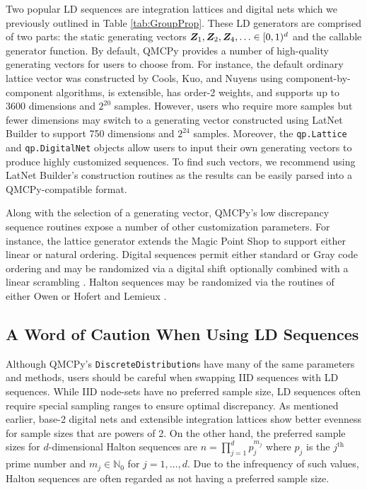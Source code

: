 \documentclass[graybox,footinfo]{svmult}
\begin{document}
Two popular LD sequences are integration lattices and digital nets which we previously outlined in Table \ref{tab:GroupProp}. These LD generators are comprised of two parts: the static generating vectors ${\boldsymbol{Z}}_1,{\boldsymbol{Z}}_2,{\boldsymbol{Z}}_4, \ldots \in [0,1)^d$ and the callable generator function. By default, QMCPy provides a number of high-quality generating vectors for users to choose from. For instance, the default ordinary lattice vector was constructed by Cools, Kuo, and Nuyens \cite{doi:10.1137/06065074X} using component-by-component algorithms, is extensible, has order-2 weights, and supports up to 3600 dimensions and $2^{20}$ samples. 
However, users who require more samples but fewer dimensions may switch to a generating vector constructed using LatNet Builder \cite{LEcEtal22a,LatNet} to support 750 dimensions and $2^{24}$ samples. Moreover, the \texttt{qp.Lattice} and \texttt{qp.DigitalNet} objects allow users to input their own generating vectors to produce highly customized sequences. To find such vectors, we recommend using LatNet Builder's construction routines as the results can be easily parsed into a QMCPy-compatible format. 

Along with the selection of a generating vector, QMCPy's low discrepancy sequence routines expose a number of other customization parameters. For instance, the lattice generator extends the Magic Point Shop \cite{Nuy17a} to support either linear or natural ordering. Digital sequences permit either standard or Gray code ordering and may be randomized via a digital shift optionally combined with a linear scrambling \cite{Mat98}. Halton sequences may be randomized via the routines of either Owen \cite{Owe20a} or Hofert and Lemieux \cite{QRNG2020}. 

\subsection{A Word of Caution When Using LD Sequences}

Although QMCPy's \texttt{DiscreteDistribution}s have many of the same parameters and methods, users should be careful when swapping IID sequences with LD sequences. While IID node-sets have no preferred sample size, LD sequences often require special sampling ranges to ensure optimal discrepancy. As mentioned  earlier, base-2 digital nets and extensible integration lattices show better evenness for sample sizes that are powers of 2. On the other hand, the preferred sample sizes for $d$-dimensional Halton sequences are $n = \prod_{j=1}^d p^{m_j}_j$ where $p_j$ is the $j^{\text{th}}$ prime number and $m_j \in \mathbb{N}_0$ for $j=1,\dots,d$. Due to the infrequency of such values, Halton sequences are often regarded as not having a preferred sample size.  
\end{document}
